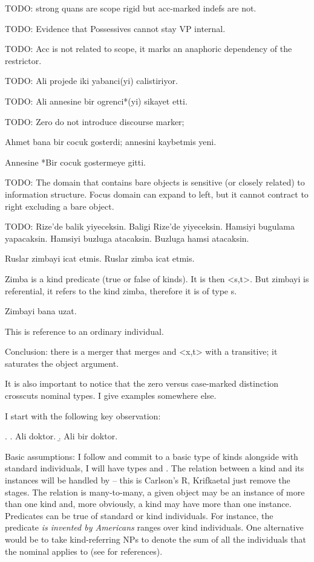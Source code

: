 \documentclass[11pt,a4paper]{article}
\begin{document}
TODO: strong quans are scope rigid but acc-marked indefs are not.

TODO: Evidence that Possessives cannot stay VP internal.

TODO: Acc is not related to scope, it marks an anaphoric dependency of the restrictor.

TODO: Ali projede iki yabanci(yi) calistiriyor.

TODO: Ali annesine bir ogrenci*(yi) sikayet etti.

TODO: Zero do not introduce discourse marker;

Ahmet bana bir cocuk gosterdi; annesini kaybetmis yeni. 

Annesine *Bir cocuk gostermeye gitti.

TODO: The domain that contains bare objects is sensitive (or closely related) to information structure. Focus domain can expand to left, but it cannot contract to right excluding a bare object.

TODO: 
Rize'de balik yiyeceksin.
Baligi Rize'de yiyeceksin. 
Hamsiyi bugulama yapacaksin.
Hamsiyi buzluga atacaksin. 
Buzluga hamsi atacaksin.

Ruslar zimbayi icat etmis.
Ruslar zimba icat etmis.

Zimba is a kind predicate (true or false of kinds). It is then <s,t>. But zimbayi is referential, it refers to the kind zimba, therefore it is of type s.

Zimbayi bana uzat.

This is reference to an ordinary individual.

Conclusion: there is a merger that merges and <x,t> with a transitive; it saturates the object argument.


It is also important to notice that the zero versus case-marked distinction crosscuts nominal types. I give examples somewhere else.

I start with the following key observation:

\ex.\label{ex:doktor} 
\a. Ali doktor.
\b. Ali bir doktor.

Basic assumptions: I follow \cite[p.\ 64]{krifkaetal95} and commit to a basic type of kinds alongside with standard individuals, I will have types  and . The relation between a kind and its instances will be handled by  -- this is Carlson's R, Krifkaetal just remove the stages. The relation is many-to-many, a given object may be an instance of more than one kind and, more obviously, a kind may have more than one instance. Predicates can be true of standard or kind individuals. For instance, the predicate \textit{is invented by Americans} ranges over kind individuals. One alternative would be to take kind-referring NPs to denote the sum of all the individuals that the nominal applies to (see \cite{krifkaetal95} for references).
\end{document}
